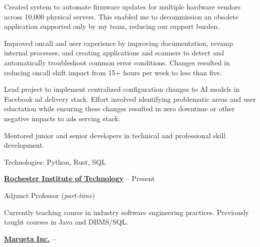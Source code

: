 \documentclass[letterpaper,MMMMyyyy,nonstopmode]{simpleresumecv}
\newif\ifLOCATION
\begin{document}
\begin{Body}
\begin{Detail}
\BulletItem
Created system to automate firmware updates for multiple hardware vendors across 10,000 physical servers. 
This enabled me to decommission an obsolete application supported only by my team, reducing our support burden.

\BulletItem
Improved oncall and user experience by improving documentation, revamp internal processes, and creating applications and scanners to detect and automatically troubleshoot common error conditions.
Changes resulted in reducing oncall shift impact from 15+ hours per week to less than five.

\BulletItem
Lead project to implement centralized configuration changes to AI models in Facebook ad delivery stack. Effort involved identifying problematic areas and user eductation while ensuring these changes resulted in zero downtime or other negative impacts to ads serving stack.

\BulletItem
Mentored junior and senior developers in technical and professional skill development.


\Gap
Technologies: Python, Rust, SQL

\Gap

\end{Detail}

\BigGap

\Entry
\href{http://ist.rit.edu/}
{\textbf{Rochester Institute of Technology}}
\hfill
 --
Present

Adjunct Professor (\textit{part-time})
\ifLOCATION
\hfill 
Rochester, New York
\fi

\begin{Detail}
\BulletItem
Currently teaching course in industry software engineering practices.
\BulletItem
Previously taught courses in Java and DBMS/SQL.
\end{Detail}

\BigGap
\Entry
\href{https://www.marqeta.com}
{\textbf{Marqeta Inc.}}
\hfill
 -- 


\end{Body}
\end{document}

